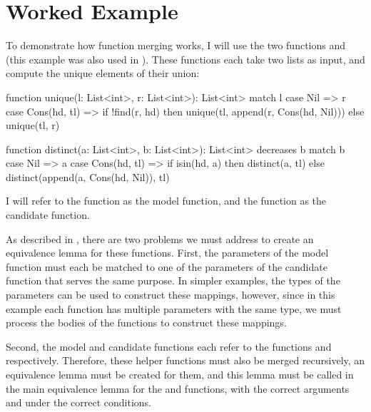 \section{Worked Example}\label{sec:worked-example}

To demonstrate how function merging works, I will use the two functions  and  (this example was also used in ). These functions each take two lists as input, and compute the unique elements of their union:

\begin{dafny}
function unique(l: List<int>, r: List<int>): List<int>
{
  match l
  case Nil => r
  case Cons(hd, tl) =>
    if !find(r, hd) then unique(tl, append(r, Cons(hd, Nil)))
    else unique(tl, r)
}

function distinct(a: List<int>, b: List<int>): List<int>
  decreases b
{
  match b
  case Nil => a
  case Cons(hd, tl) =>
    if isin(hd, a) then distinct(a, tl)
    else distinct(append(a, Cons(hd, Nil)), tl)
}
\end{dafny}
%

I will refer to the  function as the model function, and the  function as the candidate function.

As described in , there are two problems we must address to create an equivalence lemma for these functions. First, the parameters of the model function must each be matched to one of the parameters of the candidate function that serves the same purpose. In simpler examples, the types of the parameters can be used to construct these mappings, however, since in this example each function has multiple parameters with the same type, we must process the bodies of the functions to construct these mappings.

Second, the model and candidate functions each refer to the functions  and  respectively. Therefore, these helper functions must also be merged recursively, an equivalence lemma must be created for them, and this lemma must be called in the main equivalence lemma for the  and  functions, with the correct arguments and under the correct conditions. 

